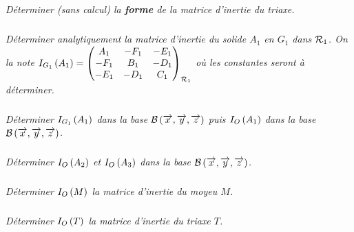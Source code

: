\documentclass[10pt,fleqn]{article} %
\begin{document}
\begin{multicols}{2}
\subparagraph{}
\textit{Déterminer (sans calcul) la \textbf{forme} de la matrice d'inertie du triaxe.}
\ifprof
\begin{corrige}
\end{corrige}
\else
\fi

\subparagraph{}
\textit{Déterminer analytiquement la matrice d'inertie du solide $A_1$ en $G_1$ dans $\rep{1}$. On la note $\inertie{G_1}{A_1}=\matinertie{A_1}{B_1}{C_1}{-D_1}{-E_1}{-F_1}{\rep{1}}$ où les constantes seront à déterminer.}
\ifprof
\begin{corrige}
\end{corrige}
\else
\fi

\subparagraph{}
\textit{Déterminer $\inertie{G_1}{A_1}$ dans la base $\mathcal{B}\base{x}{y}{z}$ puis 
$\inertie{O}{A_1}$ dans la base $\mathcal{B}\base{x}{y}{z}$.}
\ifprof
\begin{corrige}
 
\end{corrige}
\else
\fi

\subparagraph{}
\textit{Déterminer $\inertie{O}{A_2}$  et $\inertie{O}{A_3}$ dans la base $\mathcal{B}\base{x}{y}{z}$.}
\ifprof
\begin{corrige}
 
\end{corrige}
\else
\fi

\subparagraph{}
\textit{Déterminer $\inertie{O}{M}$  la matrice d'inertie du moyeu $M$.}
\ifprof
\begin{corrige}
 
\end{corrige}
\else
\fi


\subparagraph{}
\textit{Déterminer $\inertie{O}{T}$  la matrice d'inertie du triaxe $T$.}
\ifprof
\begin{corrige}
 
\end{corrige}
\else
\fi
%
%
%


\end{multicols}
\end{document}
